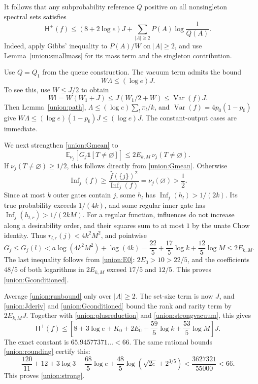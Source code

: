 \documentclass[11pt]{amsart}
\theoremstyle{definition}
\theoremstyle{remark}
\newcommand{\E}{\mathbb E}
\newcommand{\HH}{\mathsf H}
\newcommand{\I}{\mathsf I}
\DeclareMathOperator{\Var}{Var}
\DeclareMathOperator{\Inf}{Inf}
\newcommand{\wh}[1]{\widehat{#1}}
\begin{document}
It follows that any subprobability reference $Q$ positive on all nonsingleton spectral sets satisfies
\begin{equation}\label{union:plusreduction}
 \HH^+(f)\le(8+2\log e)J+
       \sum_{|A|\ge2}P(A)\log\frac1{Q(A)}.
\end{equation}
Indeed, apply Gibbs' inequality to $P(A)/W$ on $|A|\ge2$, and use Lemma~\ref{union:smallmass} for its mass term and the singleton contribution.

Use $Q=Q_1$ from the queue construction.
The vacuum term admits the bound
\begin{equation}\label{union:strongvacuum}
 W\Lambda\le(\log e)J.
\end{equation}
To see this, use $W\le J/2$ to obtain
\[
 W\I=W(W_1+J)\le J(W_1/2+W)\le\Var(f)J.
\]
Then Lemma~\ref{union:path}, $\Lambda\le(\log e)\sum_l\pi_l/k$, and
$\Var(f)=4p_0(1-p_0)$ give
$W\Lambda\le(\log e)(1-p_0)J\le(\log e)J$.
The constant-output cases are immediate.

We next strengthen \eqref{union:Gmean} to
\begin{equation}\label{union:Gconditioned}
 \E_{\nu_j}[G_j\mathbf1[T\ne\varnothing]]
 \le2E_{k,M}\,\nu_j(T\ne\varnothing).
\end{equation}
If $\nu_j(T\ne\varnothing)\ge1/2$, this follows directly from \eqref{union:Gmean}.
Otherwise
\[
 \Inf_j(f)\ge
 \frac{\wh f(\{j\})^2}{\Inf_j(f)}
 =\nu_j(\varnothing)>\frac12.
\]
Since at most $k$ outer gates contain $j$, some $h_l$ has
$\Inf_j(h_l)>1/(2k)$.
Its true probability exceeds $1/(4k)$, and some regular inner gate has
$\Inf_j(h_{l,r})>1/(2kM)$.
For a regular function, influences do not increase along a desirability order, and their squares sum to at most $1$ by the unate Chow identity.
Thus $r_{l,r}(j)<4k^2M^2$, and pointwise
\[
 G_j\le G_j(l)
 <a\log(4k^2M^2)+\log(4k)
 =\frac{22}{5}+\frac{17}{5}\log k+\frac{12}{5}\log M
 \le2E_{k,M}.
\]
The last inequality follows from \eqref{union:E0}: $2E_0>10>22/5$, and the coefficients $48/5$ of both logarithms in $2E_{k,M}$ exceed $17/5$ and $12/5$.
This proves \eqref{union:Gconditioned}.

Average \eqref{union:runbound} only over $|A|\ge2$.
The set-size term is now $J$, and \eqref{union:Jderiv} and \eqref{union:Gconditioned} bound the rank and rarity term by $2E_{k,M}J$.
Together with \eqref{union:plusreduction} and \eqref{union:strongvacuum}, this gives
\[
 \HH^+(f)\le
 \left[8+3\log e+K_0+2E_0
       +\frac{59}{5}\log k+\frac{53}{5}\log M\right]J.
\]
The exact constant is $65.94577371\ldots<66$.
The same rational bounds \eqref{union:rounding} certify this:
\[
 \frac{120}{11}+12+3\log3+\frac{68}{5}\log e
       +\frac{48}{5}\log(\sqrt{2e}+2^{3/5})
 <\frac{3627321}{55000}<66.
\]
This proves \eqref{union:strong}.
\end{document}
